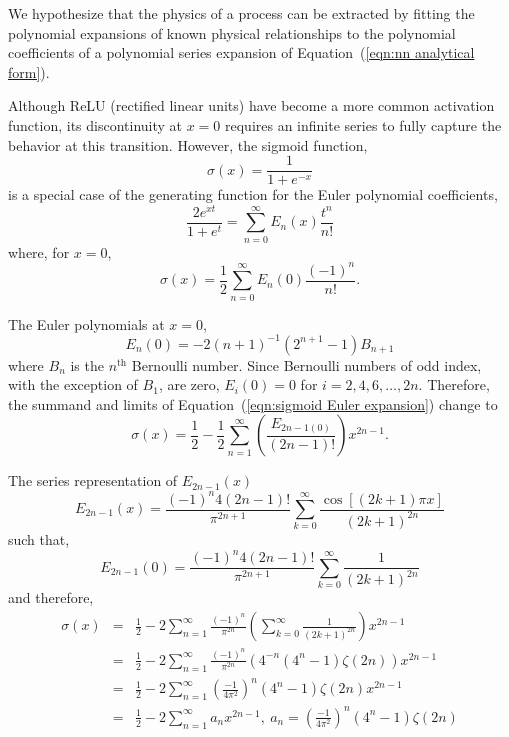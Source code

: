We hypothesize that the physics of a process can be extracted by fitting the polynomial expansions of known physical relationships to the polynomial coefficients of a polynomial series expansion of Equation~(\ref{eqn:nn analytical form}).

Although ReLU (rectified linear units) have become a more common activation function, its discontinuity at $x = 0$ requires an infinite series to fully capture the behavior at this transition. However, the sigmoid function,
\begin{equation}
	\sigma(x) = \frac{1}{1 + e^{-x}}
	\label{eqn:sigmoid}
\end{equation}
is a special case of the generating function for the Euler polynomial coefficients,
\begin{equation}
	\frac{2e^{x t}}{1 + e^t} = \sum_{n=0}^\infty E_n(x) \frac{t^n}{n!}
\end{equation}
where, for $x = 0$,
\begin{equation}
	\sigma(x) = \frac{1}{2} \sum_{n=0}^\infty E_n(0) \frac{(-1)^n}{n!}.
	\label{eqn:sigmoid Euler expansion}
\end{equation}

The Euler polynomials at $x=0$,
\begin{equation}
	E_n(0) = -2(n+1)^{-1} \left( 2^{n+1} - 1 \right) B_{n+1}
\end{equation}
where $B_n$ is the $n^\textrm{th}$ Bernoulli number. Since Bernoulli numbers of odd index, with the exception of $B_1$, are zero, $E_i(0) = 0$ for $i = 2, 4, 6, \ldots, 2n$. Therefore, the summand and limits of Equation~(\ref{eqn:sigmoid Euler expansion}) change to
\begin{equation}
	\sigma(x) = \frac{1}{2} - \frac{1}{2} \sum_{n=1}^\infty \left( \frac{E_{2n-1(0)}}{(2n-1)!} \right) x^{2n-1}.
\end{equation}

The series representation of $E_{2n-1}(x)$
\begin{equation}
	E_{2n-1}(x) = \frac{(-1)^n 4 (2n - 1)!}{\pi^{2n+1}} \sum_{k=0}^\infty \frac{\cos [(2k + 1) \pi x]}{(2k + 1)^{2n}}
\end{equation}
such that,
\begin{equation}
	E_{2n-1}(0) = \frac{(-1)^n 4 (2n - 1)!}{\pi^{2n+1}} \sum_{k=0}^\infty \frac{1}{(2k + 1)^{2n}}
\end{equation}
and therefore,
\begin{eqnarray}
	\sigma(x) & = & \frac{1}{2} - 2 \sum_{n=1}^\infty \frac{(-1)^n}{\pi^{2n}} \left( \sum_{k=0}^\infty \frac{1}{(2k+1)^{2n}} \right) x^{2n-1} \\
		& = & \frac{1}{2} - 2 \sum_{n=1}^\infty \frac{(-1)^n}{\pi^{2n}} \left( 4^{-n} \left( 4^n - 1 \right) \zeta(2n) \right) x^{2n-1} \nonumber \\
		& = & \frac{1}{2} - 2 \sum_{n=1}^\infty \left( \frac{-1}{4\pi^2} \right)^n \left( 4^n - 1 \right) \zeta(2n) x^{2n-1} \nonumber \\
		& = & \frac{1}{2} - 2 \sum_{n=1}^\infty a_n x^{2n - 1},\ a_n = \left( \frac{-1}{4\pi^2} \right)^n \left( 4^n - 1 \right) \zeta(2n)
		\label{eqn:sigmoid zeta expansion}
\end{eqnarray}
